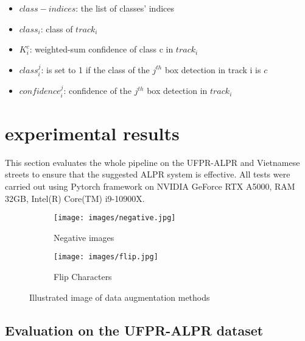 \documentclass[conference]{IEEEtran}
\begin{document}
\begin{itemize}[where:]
    \item $class-indices$: the list of classes' indices
    \item $class_i$: class of $track_i$
    \item $K_i^c$: weighted-sum confidence of class c in $track_i$
    \item $class_i^j$: is set to 1 if the class of the $j^{th}$ box detection in track i is $c$
\item $confidence_i^j$: confidence of the $j^{th}$ box detection in $track_i$
\end{itemize}




\section{experimental results}
This section evaluates the whole pipeline on the UFPR-ALPR and Vietnamese streets to ensure that the suggested ALPR system is effective. All tests were carried out using Pytorch framework on NVIDIA GeForce RTX A5000, RAM 32GB, Intel(R) Core(TM) i9-10900X.

\begin{figure}[htp]
  \centering
    \begin{subfigure}{0.45\columnwidth}
        \texttt{[image: images/negative.jpg]}
        \caption{Negative images} 
    \end{subfigure} 
\begin{subfigure}{0.45\columnwidth}
        \texttt{[image: images/flip.jpg]}
        \caption{Flip Characters} 
    \end{subfigure} 
    \caption{Illustrated image of data augmentation methods}
    \label{flipchar}
\end{figure}







\subsection{Evaluation on the UFPR-ALPR dataset}
\end{document}
